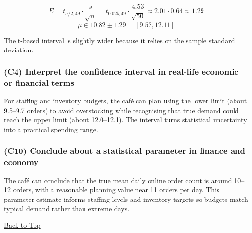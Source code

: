 \[
E = t_{\alpha/2,49} \cdot \frac{s}{\sqrt{n}} = t_{0.025,49} \cdot \frac{4.53}{\sqrt{50}} \approx 2.01 \cdot 0.64 \approx 1.29
\]
\[
\mu \in 10.82 \pm 1.29 = [9.53, 12.11]
\]

The t-based interval is slightly wider because it relies on the sample standard deviation.

\subsubsection{(C4) Interpret the confidence interval in real-life economic or financial terms}\label{subsubsec:interval-example1-2-c4}

For staffing and inventory budgets, the café can plan using the lower limit (about 9.5--9.7 orders) to avoid overstocking while recognising that true demand could reach the upper limit (about 12.0--12.1). The interval turns statistical uncertainty into a practical spending range.

\subsubsection{(C10) Conclude about a statistical parameter in finance and economy}\label{subsubsec:interval-example1-2-c10}

The café can conclude that the true mean daily online order count is around 10--12 orders, with a reasonable planning value near 11 orders per day. This parameter estimate informs staffing levels and inventory targets so budgets match typical demand rather than extreme days.

\vspace{6pt}
\noindent\hyperref[table-of-contents]{Back to Top}
